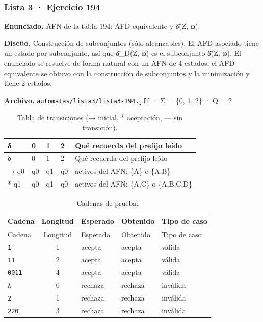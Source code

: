 
\hypertarget{lista-3-ejercicio-194}{%
\subsubsection{Lista 3 · Ejercicio 194}\label{lista-3-ejercicio-194}}

\textbf{Enunciado.} AFN de la tabla 194: AFD equivalente y δ̂(Z, ω).

\textbf{Diseño.} Construcción de subconjuntos (sólo alcanzables). El AFD asociado tiene un estado por subconjunto, así que δ̂\_D(Z, ω) es el subconjunto δ̂(Z, ω). El enunciado se resuelve de forma natural con un AFN de 4 estados; el AFD equivalente se obtuvo con la construcción de subconjuntos y la minimización y tiene 2 estados.

\textbf{Archivo.} \texttt{automatas/lista3/lista3-194.jff} · Σ = \{0, 1, 2\} · \textbar Q\textbar{} = 2

\begin{longtable}[]{@{}lllll@{}}
\caption{Tabla de transiciones (→ inicial, * aceptación, --- sin transición).}\tabularnewline
\toprule\noalign{}
δ & 0 & 1 & 2 & Qué recuerda del prefijo leído \\
\midrule\noalign{}
\endfirsthead
\toprule\noalign{}
δ & 0 & 1 & 2 & Qué recuerda del prefijo leído \\
\midrule\noalign{}
\endhead
\bottomrule\noalign{}
\endlastfoot
→ q0 & q0 & q1 & q0 & activos del AFN: \{A\} o \{A,B\} \\
* q1 & q0 & q1 & q0 & activos del AFN: \{A,C\} o \{A,B,C,D\} \\
\end{longtable}

\begin{longtable}[]{@{}lclll@{}}
\caption{Cadenas de prueba.}\tabularnewline
\toprule\noalign{}
Cadena & Longitud & Esperado & Obtenido & Tipo de caso \\
\midrule\noalign{}
\endfirsthead
\toprule\noalign{}
Cadena & Longitud & Esperado & Obtenido & Tipo de caso \\
\midrule\noalign{}
\endhead
\bottomrule\noalign{}
\endlastfoot
\texttt{1} & 1 & acepta & acepta & válida \\
\texttt{11} & 2 & acepta & acepta & válida \\
\texttt{0011} & 4 & acepta & acepta & válida \\
λ & 0 & rechaza & rechaza & inválida \\
\texttt{2} & 1 & rechaza & rechaza & inválida \\
\texttt{220} & 3 & rechaza & rechaza & inválida \\
\end{longtable}

